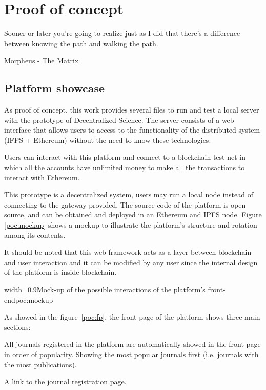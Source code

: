 \chapter{Proof of concept}
\label{poc}
\begin{FraseCelebre}
  \begin{Frase}
    Sooner or later you're going to realize just as I did that there's a
    difference between knowing the path and walking the path.
  \end{Frase}
  \begin{Fuente}
    Morpheus - The Matrix
  \end{Fuente}
\end{FraseCelebre}

\section{Platform showcase}

As proof of concept, this work provides several files to run and test a local
server with the prototype of Decentralized Science. The server consists of a web
interface that allows users to access to the functionality of the distributed
system (IFPS + Ethereum) without the need to know these technologies.

Users can interact with this platform and connect to a blockchain test net in
which all the accounts have unlimited money to make all the transactions to
interact with Ethereum.

This prototype is a decentralized system, users may run a local node instead of
connecting to the gateway provided. The source code of the platform is open
source, and can be obtained and deployed in an Ethereum and IPFS node. Figure
\ref{poc:mockup} shows a mockup to illustrate the platform's structure and
rotation among its contents.

It should be noted that this web framework acts as a layer between blockchain
and user interaction and it can be modified by any user since the internal
design of the platform is inside blockchain.

 {width=0.9\linewidth}{Mock-up of the possible
  interactions of the platform's front-end}{poc:mockup}



As showed in the figure~\ref{poc:fp}, the front page of the platform shows three
main sections:

\begin{itemize}
   All journals registered in
  the platform are automatically showed in the front page in order of
  popularity. Showing the most popular journals first (i.e. journals with the
  most publications).

   A link to the journal registration page.

\end{itemize}

